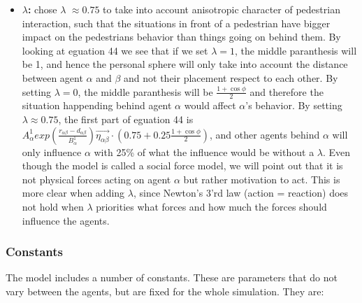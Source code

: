 \begin{itemize}
    \item \textbf{$\lambda$:} \cite{self-org} chose $\lambda$ $\approx 0.75$ to take into account
	anisotropic character of pedestrian interaction, such that the situations in front of
	a pedestrian have bigger impact on the pedestrians behavior than things going on
	behind them. By looking at eguation 44 we see that if we set $\lambda = 1$, the middle 
	paranthesis will be 1, and hence the personal sphere will only take into account the distance
	between agent $\alpha$ and $\beta$ and not their placement respect to each other. By setting $\lambda = 0$, the middle paranthesis will be
	$\frac{1+\cos{\phi}}{2}$
	and therefore the situation happending behind agent $\alpha$ would affect $\alpha$'s behavior.
	By setting $\lambda \approx 0.75$, the first part of eguation 44 is
	 $A_{\alpha}^{1} exp \left(
            \frac{ r_{\alpha \beta} - d_{\alpha \beta }}
                 {B_{\alpha}^1}
	    \right)
	  \vec{\eta_{\alpha \beta}} \cdot
	  \left(
	      0.75 + 0.25
		\frac{1+\cos{\phi}}{2}
	    \right)$,
	and  other agents behind $\alpha$ will only influence $\alpha$ with 25\% of what the influence would be without a $\lambda$.
	Even though the model is called a social force model, we will point out that it is not physical forces acting on agent $\alpha$ but
	rather motivation to act. This is more clear when adding $\lambda$, since Newton's 3'rd law (action = reaction) does not hold
	when $\lambda$ priorities what forces and how much the forces should influence the agents.
\end{itemize}

\subsubsection{Constants}
The model includes a number of constants. These are parameters that do not 
vary between the agents, but are fixed for the whole simulation. They are:

